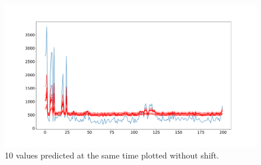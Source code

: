\begin{figure}
	\centering
	\includegraphics[width=1\linewidth]{Pictures/RangePrediction/LSTM_Range_1}
	\caption{10 values predicted at the same time plotted without shift.}
	\label{fig:lstmrange1}
\end{figure}
